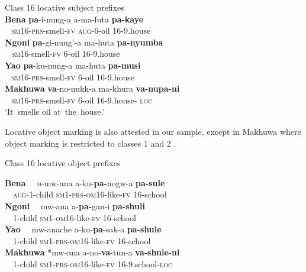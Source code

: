 \documentclass[output=paper ]{langscibook}
\begin{document}
\ea
Class 16 locative subject prefixes\\
\label{extab:mapunda:5}
\gllllllll \textbf{Bena}  \textbf{pa}{}-i-nung-a    a-ma-futa         \textbf{pa-kaye}\\
~ \textsc{sm16-prs}{}-smell-\textsc{fv}  \textsc{aug}{}-6-oil         16-9.house  \\
\textbf{Ngoni}  \textbf{pa}{}-gi-nung’-a    ma-huta           \textbf{pa-nyumba}\\
~ \textsc{sm16}{}-smell-\textsc{fv}  6-oil                16-9.house\\
 \textbf{Yao}  \textbf{pa}{}-ku-nung-a    ma-huta           \textbf{pa-musi}\\
~ \textsc{sm16-prs}{}-smell-\textsc{fv}  6-oil                 16-9.house\\
 \textbf{Makhuwa} \textbf{va}{}-no-nukh-a    ma-khura        \textbf{va-nupa-ni}\\
~ \textsc{sm16-prs}{}-smell-\textsc{fv}  6-oil                16-9.house- \textsc{loc}  \\
\glt ‘It~smells oil at~the~house.’\\
\z

Locative object marking is also attested in our sample, except in Makhuwa where object marking is restricted to classes 1 and 2 .

\ea
Class 16 locative object prefixes\\
\label{extab:mapunda:xx}

\gllllllll \textbf{Bena} ~~u-mw-ana  a-ku-\textbf{pa-}nogw-a    \textbf{pa-sule} \\
{} ~~\textsc{aug}{}-1-child   \textsc{sm1-prs}{}-\textsc{om16}{}-like-\textsc{fv}  16-school\\
\textbf{Ngoni} ~~mw-ana  a{}-\textbf{pa-}gan-i    \textbf{pa-shuli}\\
{} ~~1-child   \textsc{sm1-om16}{}-like-\textsc{fv}  16-school\\
\textbf{Yao}  ~~mw-anache  a-ku-\textbf{pa}{}-sak-a      \textbf{pa-shule} \\
{} ~~1-child   \textsc{sm1-prs-om16}{}-like-\textsc{fv}  16-school\\
\textbf{Makhuwa}  *mw-ana  a-no-\textbf{va}{}-tun-a      \textbf{va-shule-ni} \\
{} ~~1-child   \textsc{sm1-prs-om16}{}-like-\textsc{fv}  16-9.school-\textsc{loc}\\
\end{document}
